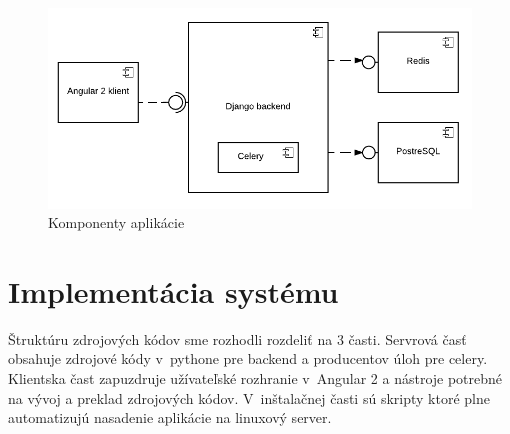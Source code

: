\begin{figure}[htbp]
 \centering 
 \begin{minipage}{0.95\linewidth}
 	\centering
 	\includegraphics[width=\textwidth]{Images/thesis-component-diagram.pdf}	
 \end{minipage}
  \caption{Komponenty aplikácie }
  \label{fig:components}
\end{figure}

\section{Implementácia systému}
Štruktúru zdrojových kódov sme rozhodli rozdeliť na 3 časti. Servrová časť obsahuje zdrojové kódy v~pythone pre backend a producentov úloh pre celery. Klientska čast zapuzdruje užívateľské rozhranie v~Angular 2 a nástroje potrebné na vývoj a preklad zdrojových kódov. V~inštalačnej časti sú skripty ktoré plne automatizujú nasadenie aplikácie na linuxový server.